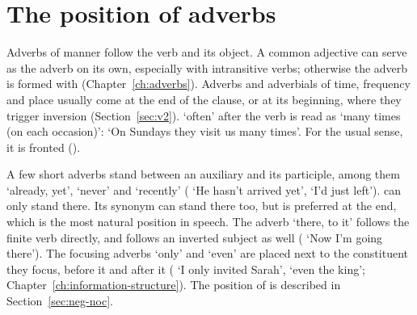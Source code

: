 \section{The position of adverbs}\label{sec:adverb-position}
Adverbs of manner follow the verb and its object. A common adjective can serve as the adverb on its own, especially with intransitive verbs; otherwise the adverb is formed with  (Chapter~\ref{ch:adverbs}).
Adverbs and adverbials of time, frequency and place usually come at the end of the clause, or at its beginning, where they trigger inversion (Section~\ref{sec:v2}).
 `often' after the verb is read as `many times (on each occasion)':  `On Sundays they visit us many times'. For the usual sense, it is fronted ().

A few short adverbs stand between an auxiliary and its participle, among them  `already, yet',  `never' and  `recently' ( `He hasn't arrived yet',  `I'd just left').  can only stand there. Its synonym  can stand there too, but is preferred at the end, which is the most natural position in speech.
The adverb  `there, to it' follows the finite verb directly, and follows an inverted subject as well ( `Now I'm going there').
The focusing adverbs  `only' and  `even' are placed next to the constituent they focus,  before it and  after it ( `I only invited Sarah',  `even the king'; Chapter~\ref{ch:information-structure}). The position of  is described in Section~\ref{sec:neg-noc}.


